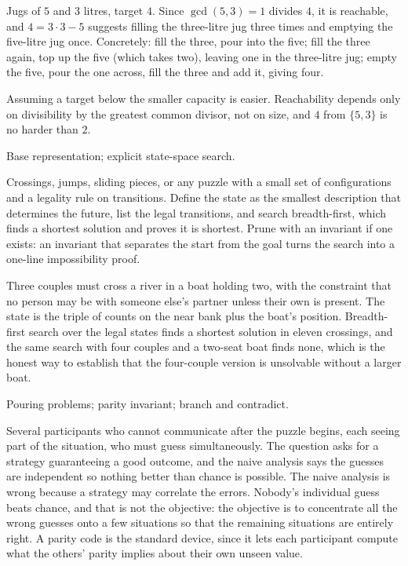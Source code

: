 \begin{worked}
Jugs of $5$ and $3$ litres, target $4$. Since $\gcd(5,3)=1$ divides $4$, it is reachable, and $4=3\cdot3-5$ suggests filling the three-litre jug three times and emptying the five-litre jug once. Concretely: fill the three, pour into the five; fill the three again, top up the five (which takes two), leaving one in the three-litre jug; empty the five, pour the one across, fill the three and add it, giving four.
\end{worked}

\begin{trap}
Assuming a target below the smaller capacity is easier. Reachability depends only on divisibility by the greatest common divisor, not on size, and $4$ from $\{5,3\}$ is no harder than $2$.
\end{trap}

\begin{seealsob}Base representation; explicit state-space search.\end{seealsob}

\cue Crossings, jumps, sliding pieces, or any puzzle with a small set of configurations and a legality rule on transitions.
\method Define the state as the smallest description that determines the future, list the legal transitions, and search breadth-first, which finds a shortest solution and proves it is shortest. Prune with an invariant if one exists: an invariant that separates the start from the goal turns the search into a one-line impossibility proof.

\begin{worked}
Three couples must cross a river in a boat holding two, with the constraint that no person may be with someone else's partner unless their own is present. The state is the triple of counts on the near bank plus the boat's position. Breadth-first search over the legal states finds a shortest solution in eleven crossings, and the same search with four couples and a two-seat boat finds none, which is the honest way to establish that the four-couple version is unsolvable without a larger boat.
\end{worked}

\begin{seealsob}Pouring problems; parity invariant; branch and contradict.\end{seealsob}

\cue Several participants who cannot communicate after the puzzle begins, each seeing part of the situation, who must guess simultaneously. The question asks for a strategy guaranteeing a good outcome, and the naive analysis says the guesses are independent so nothing better than chance is possible.
\method The naive analysis is wrong because a strategy may correlate the errors. Nobody's individual guess beats chance, and that is not the objective: the objective is to concentrate all the wrong guesses onto a few situations so that the remaining situations are entirely right. A parity code is the standard device, since it lets each participant compute what the others' parity implies about their own unseen value.


